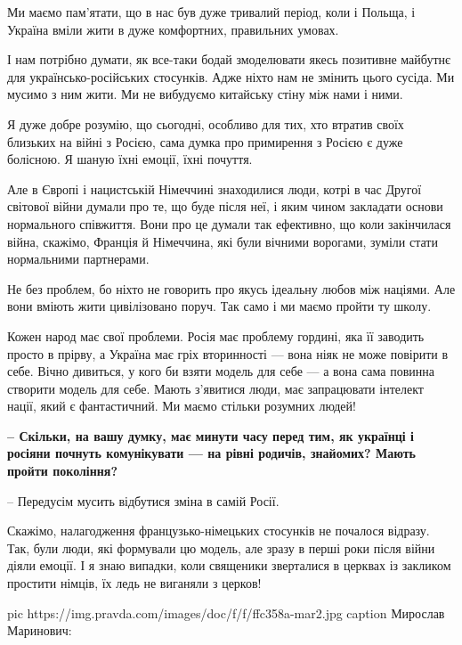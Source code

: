 Ми маємо пам’ятати, що в нас був дуже тривалий період, коли і Польща, і Україна
вміли жити в дуже комфортних, правильних умовах. 

І нам потрібно думати, як все-таки бодай змоделювати якесь позитивне майбутнє
для українсько-російських стосунків. Адже ніхто нам не змінить цього сусіда. Ми
мусимо з ним жити. Ми не вибудуємо китайську стіну між нами і ними. 

Я дуже добре розумію, що сьогодні, особливо для тих, хто втратив своїх близьких
на війні з Росією, сама думка про примирення з Росією є дуже болісною. Я шаную
їхні емоції, їхні почуття. 

Але в Європі і нацистській Німеччині знаходилися люди, котрі в час Другої
світової війни думали про те, що буде після неї, і яким чином закладати основи
нормального співжиття. Вони про це думали так ефективно, що коли закінчилася
війна, скажімо, Франція й Німеччина, які були вічними ворогами, зуміли стати
нормальними партнерами. 

Не без проблем, бо ніхто не говорить про якусь ідеальну любов між націями. Але
вони вміють жити цивілізовано поруч. Так само і ми маємо пройти ту школу. 

Кожен народ має свої проблеми. Росія має проблему гордині, яка її заводить
просто в прірву, а Україна має гріх вторинності --- вона ніяк не може повірити в
себе. Вічно дивиться, у кого би взяти модель для себе --- а вона сама повинна
створити модель для себе. Мають з’явитися люди, має  запрацювати інтелект
нації, який є фантастичний. Ми маємо стільки розумних людей!

\textbf{– Скільки, на вашу думку, має минути часу перед тим, як українці і росіяни
почнуть комунікувати --- на рівні родичів, знайомих? Мають пройти покоління?}

– Передусім мусить відбутися зміна в самій Росії. 

Скажімо, налагодження французько-німецьких стосунків не почалося відразу. Так,
були люди, які формували цю модель, але зразу в перші роки після війни діяли
емоції. І я знаю випадки, коли священики зверталися в церквах із закликом
простити німців, їх ледь не виганяли з церков!

\ifcmt
pic https://img.pravda.com/images/doc/f/f/ffc358a-mar2.jpg
caption Мирослав Маринович: 
\fi

